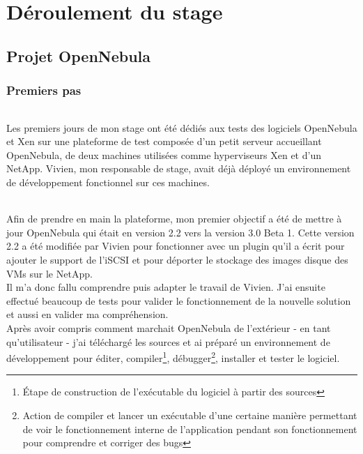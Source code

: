 \part{Déroulement du stage}

\chapter{Projet OpenNebula}

\section{Premiers pas}

\paragraph*{}
Les premiers jours de mon stage ont été dédiés aux tests des logiciels OpenNebula et Xen sur une plateforme de test
composée d'un petit serveur accueillant OpenNebula, de deux machines utilisées comme hyperviseurs Xen et d'un NetApp.
Vivien, mon responsable de stage, avait déjà déployé un environnement de développement fonctionnel sur ces machines.

\paragraph*{}
Afin de prendre en main la plateforme, mon premier objectif a été de mettre à jour OpenNebula qui était en version 2.2 vers la version 3.0 Beta 1.
Cette version 2.2 a été modifiée par Vivien pour fonctionner avec un plugin qu'il a écrit pour ajouter le support de l'iSCSI et pour déporter le stockage des images
disque des VMs sur le NetApp.
\\
Il m'a donc fallu comprendre puis adapter le travail de Vivien. J'ai ensuite effectué beaucoup de tests pour valider le fonctionnement
de la nouvelle solution et aussi en valider ma compréhension.
\\
Après avoir compris comment marchait OpenNebula de l'extérieur - en tant qu'utilisateur - j'ai téléchargé les sources et ai préparé un
environnement de développement pour éditer, compiler\footnote{Étape de construction de l'exécutable du logiciel à partir des sources},
débugger\footnote{Action de compiler et lancer un exécutable d'une certaine manière permettant de voir le fonctionnement interne de l'application
pendant son fonctionnement pour comprendre et corriger des bugs}, installer et tester le logiciel.


